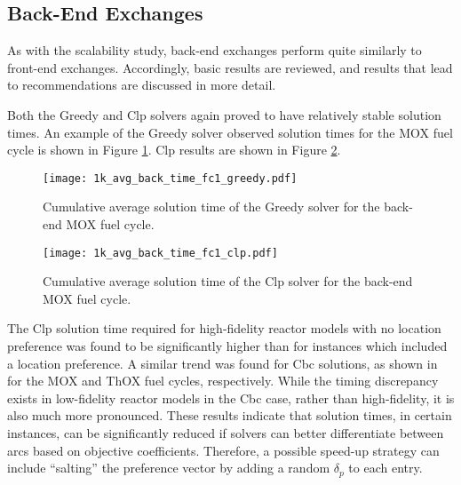 \subsection{Back-End Exchanges}

As with the scalability study, back-end exchanges perform quite similarly to
front-end exchanges. Accordingly, basic results are reviewed, and results that
lead to recommendations are discussed in more detail.


Both the Greedy and Clp solvers again proved to have relatively stable solution
times. An example of the Greedy solver observed solution times for the MOX fuel
cycle is shown in Figure \ref{fig:1k_avg_back_time_fc1_greedy}. Clp results are
shown in Figure \ref{fig:1k_avg_back_time_fc1_clp}. 

\begin{figure}[h!]
  \begin{center}
    \texttt{[image: 1k\_avg\_back\_time\_fc1\_greedy.pdf]}
    \caption[]{
      \label{fig:1k_avg_back_time_fc1_greedy}
      Cumulative average solution time of the Greedy solver for the back-end MOX
      fuel cycle.}
  \end{center}
\end{figure}

\begin{figure}[h!]
  \begin{center}
    \texttt{[image: 1k\_avg\_back\_time\_fc1\_clp.pdf]}
    \caption[]{
      \label{fig:1k_avg_back_time_fc1_clp}
      Cumulative average solution time of the Clp solver for the back-end MOX
      fuel cycle.}
  \end{center}
\end{figure}

The Clp solution time required for high-fidelity reactor models with no location
preference was found to be significantly higher than for instances which
included a location preference. A similar trend was found for Cbc solutions, as
shown in  for
the MOX and ThOX fuel cycles, respectively. While the timing discrepancy exists
in low-fidelity reactor models in the Cbc case, rather than high-fidelity, it is
also much more pronounced. These results indicate that solution times, in
certain instances, can be significantly reduced if solvers can better
differentiate between arcs based on objective coefficients. Therefore, a
possible speed-up strategy can include ``salting'' the preference vector by
adding a random $\delta_p$ to each entry.

